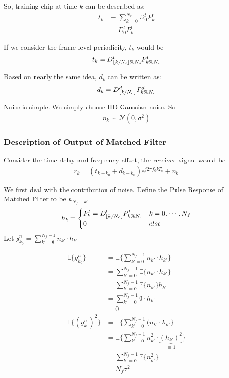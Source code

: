 \documentclass[a4paper]{report}
\DeclarePairedDelimiter\floor{\lfloor}{\rfloor}
\begin{document}
So, training chip at time $k$ can be described as:
\begin{align}
		t_k 
	&= \sum_{k = 0}^{N_c} D^t_0 P^t_{k}\\
	&= D^t_0 P^t_k \label{eq:t_k only consider the cyclic property of symbol level}
\end{align}

If we consider the frame-level periodicity, $t_k$ would be
\begin{align}
	t_k = D^t_{\floor{k / N_c} \% N_s} P^t_{k \% N_c}
\end{align}

Based on nearly the same idea, $d_k$ can be written as:
\begin{align}
	d_k = D^d_{\floor{k / N_c}} P^d_{k \% N_c}
\end{align}

Noise is simple. We simply choose IID Gaussian noise. So
\begin{align}
	n_k \sim \mathcal{N}(0, \sigma^2)
\end{align}

\subsubsection{Description of Output of Matched Filter} %
\label{ssub:description_of_output_of_matched_filter}
Consider the time delay and frequency offset, the received signal would be 
\begin{align}
	r_k = (t_{k - k_0} + d_{k - k_0}) e^{j 2\pi f_0 k T_c} + n_k
\end{align}

We first deal with the contribution of noise.
Define the Pulse Response of Matched Filter to be $h_{N_f-k}$.
\begin{align}
	h_k = 
	\begin{cases}
	P^t_{k} = D^t_{\floor{k/N_c}}P^t_{k\%N_c} & k = 0, \cdots, N_f\\
	0 	& else	
	\end{cases}
\end{align}
Let $g^n_{k_0}= \sum_{k' = 0}^{N_f-1} n_{k'} \cdot h_{k'}$

\begin{align}
	\mathbb{E} \{ g^n_{k_0}\}
	&= \mathbb{E} \{\sum_{k' = 0}^{N_f-1} n_{k'} \cdot h_{k'}\} \\
	&= \sum_{k' = 0}^{N_f-1} \mathbb{E} \{ n_{k'} \cdot h_{k'} \} \\
	&= \sum_{k' = 0}^{N_f-1} \mathbb{E} \{ n_{k'}\} h_{k'} \\
	&= \sum_{k' = 0}^{N_f-1} 0 \cdot h_{k'} \\
	&= 0\\
	\mathbb{E} \{ (g^n_{k_0})^2\}
	&= \mathbb{E} \{\sum_{k' = 0}^{N_f-1} (n_{k'} \cdot h_{k'}\} \\
	&= \mathbb{E} \{\sum_{k' = 0}^{N_f-1} n_{k'}^2 \cdot \underbrace{(h_{k'})^2}_{\equiv1}\} \\
	&= \sum_{k' = 0}^{N_f-1} \mathbb{E} \{n_{k'}^2 \}\\
	&= N_f \sigma^2
\end{align}
\end{document}
